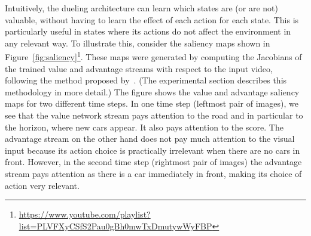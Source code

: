 Intuitively, the dueling architecture can learn which states are (or are not) valuable, without having to learn the effect of each action for each state. This is particularly useful %
in states where its actions do not affect the environment in any relevant way. To illustrate this, consider the saliency maps shown in Figure~\ref{fig:saliency}\footnote{\url{https://www.youtube.com/playlist?list=PLVFXyCSfS2Pau0gBh0mwTxDmutywWyFBP}}.
These maps were generated by computing the Jacobians of the trained value and advantage streams with respect to the input video, following the method proposed by~\citet{Simonyan:2013}. (The experimental section describes this methodology in more detail.) The figure shows the value and advantage saliency maps for two different time steps. In one time step (leftmost pair of images), we see that the value network stream pays attention to the road and in particular to the horizon, where new cars appear. It also pays attention to the score. The advantage stream on the other hand does not pay much attention to the visual input because its action choice is practically irrelevant when there are no cars in front. However, in the second time step (rightmost pair of images) the advantage stream pays attention as there is a car immediately in front, making its choice of action very relevant. 
